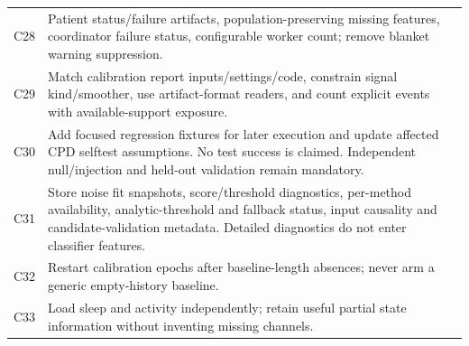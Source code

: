 \documentclass[11pt,a4paper]{article}
\begin{document}
\begin{longtable}{@{}p{}p{}@{}}
C28 & Patient status/failure artifacts, population-preserving missing features, coordinator failure status, configurable worker count; remove blanket warning suppression. \\
C29 & Match calibration report inputs/settings/code, constrain signal kind/smoother, use artifact-format readers, and count explicit events with available-support exposure. \\
C30 & Add focused regression fixtures for later execution and update affected CPD selftest assumptions. No test success is claimed. Independent null/injection and held-out validation remain mandatory. \\
C31 & Store noise fit snapshots, score/threshold diagnostics, per-method availability, analytic-threshold and fallback status, input causality and candidate-validation metadata. Detailed diagnostics do not enter classifier features. \\
C32 & Restart calibration epochs after baseline-length absences; never arm a generic empty-history baseline. \\
C33 & Load sleep and activity independently; retain useful partial state information without inventing missing channels. \\
\bottomrule
\end{longtable}
\end{document}
